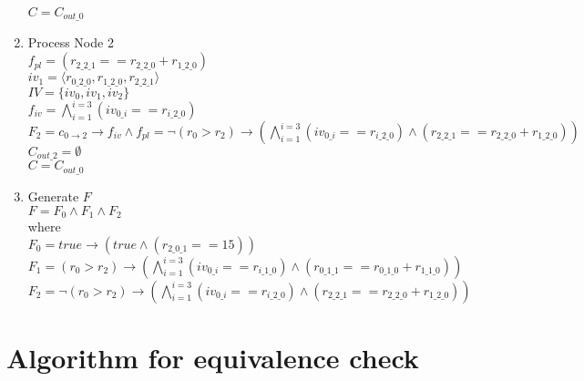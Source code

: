\documentclass{article}
\begin{document}
\begin{enumerate}
$C = C_{out\_0}$ 
\item Process Node 2 \\
$f_{pl} = (r_{2\_2\_1} == r_{2\_2\_0} + r_{1\_2\_0})$\\
$iv_1 = \langle r_{0\_2\_0},r_{1\_2\_0},r_{2\_2\_1}\rangle$\\ 
$IV = \{iv_0, iv_1, iv_2\}$\\
$f_{iv} = \bigwedge_{i=1}^{i=3} (iv_{0\_i} == r_{i\_2\_0})$\\
$F_2 = c_{0\rightarrow 2} \rightarrow f_{iv} \wedge f_{pl} = \neg(r_0 > r_2)\rightarrow (\bigwedge_{i=1}^{i=3} (iv_{0\_i} == r_{i\_2\_0})\wedge (r_{2\_2\_1} == r_{2\_2\_0} + r_{1\_2\_0}))$ \\
$C_{out\_2} = \emptyset$ \\
$C = C_{out\_0}$ 
\item Generate $F$ \\
$F = F_0 \wedge F_1 \wedge F_2$ \\
where \\
$F_0 = true\rightarrow  (true \wedge (r_{2\_0\_1} == 15))$ \\
$F_1 = (r_0 > r_2)\rightarrow (\bigwedge_{i=1}^{i=3} (iv_{0\_i} == r_{i\_1\_0}) \wedge (r_{0\_1\_1} == r_{0\_1\_0} + r_{1\_1\_0}))$ \\
$F_2 = \neg(r_0 > r_2)\rightarrow (\bigwedge_{i=1}^{i=3} (iv_{0\_i} == r_{i\_2\_0})\wedge (r_{2\_2\_1} == r_{2\_2\_0} + r_{1\_2\_0}))$ 
\end{enumerate}

\section{Algorithm for equivalence check}
\end{document}
